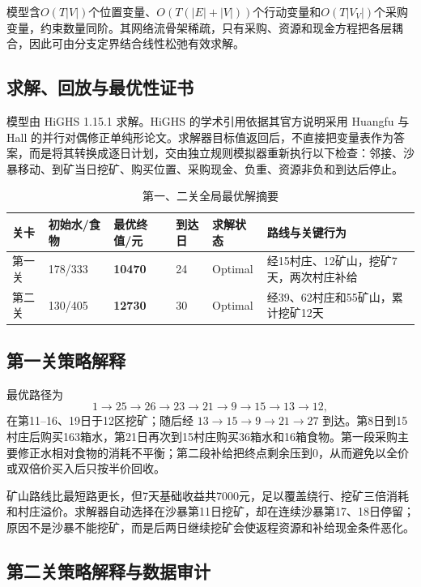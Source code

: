 模型含$O(T|V|)$个位置变量、$O(T(|E|+|V|))$个行动变量和$O(T|V_V|)$个采购变量，约束数量同阶。其网络流骨架稀疏，只有采购、资源和现金方程把各层耦合，因此可由分支定界结合线性松弛有效求解\cite{bertsimas1997}。

\subsection{求解、回放与最优性证书}

模型由 HiGHS 1.15.1 求解。HiGHS 的学术引用依据其官方说明采用 Huangfu 与 Hall 的并行对偶修正单纯形论文\cite{huangfu2018}。求解器目标值返回后，不直接把变量表作为答案，而是将其转换成逐日计划，交由独立规则模拟器重新执行以下检查：邻接、沙暴移动、到矿当日挖矿、购买位置、采购现金、负重、资源非负和到达后停止。

\begin{table}[H]
\centering
\caption{第一、二关全局最优解摘要}
\label{tab:q1-summary}
\begin{tabularx}{0.92\textwidth}{C{1.3cm} C{2.0cm} C{2.0cm} C{1.6cm} C{2.2cm} Y}
\toprule
关卡 & 初始水/食物 & 最优终值/元 & 到达日 & 求解状态 & 路线与关键行为\\
\midrule
第一关 & 178/333 & \textbf{10470} & 24 & Optimal & 经15村庄、12矿山，挖矿7天，两次村庄补给\\
第二关 & 130/405 & \textbf{12730} & 30 & Optimal & 经39、62村庄和55矿山，累计挖矿12天\\
\bottomrule
\end{tabularx}
\end{table}

\subsection{第一关策略解释}

最优路径为
\[
1\to25\to26\to23\to21\to9\to15\to13\to12,
\]
在第11--16、19日于12区挖矿；随后经 $13\to15\to9\to21\to27$ 到达。第8日到15村庄后购买163箱水，第21日再次到15村庄购买36箱水和16箱食物。第一段采购主要修正水相对食物的消耗不平衡；第二段补给把终点剩余压到0，从而避免以全价或双倍价买入后只按半价回收。

矿山路线比最短路更长，但7天基础收益共7000元，足以覆盖绕行、挖矿三倍消耗和村庄溢价。求解器自动选择在沙暴第11日挖矿，却在连续沙暴第17、18日停留；原因不是沙暴不能挖矿，而是后两日继续挖矿会使返程资源和补给现金条件恶化。

\subsection{第二关策略解释与数据审计}


